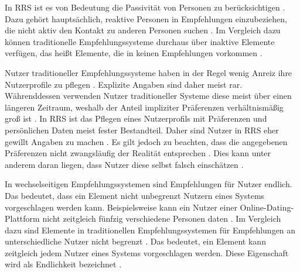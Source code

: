 In RRS ist es von Bedeutung die Passivität von Personen zu berücksichtigen \cite[S. 35]{li:inproceedings}.
Dazu gehört hauptsächlich, reaktive Personen in Empfehlungen einzubeziehen, die nicht aktiv den Kontakt zu anderen Personen suchen \cite[S. 459]{pizzato:2013}.
Im Vergleich dazu können traditionelle Empfehlungssysteme durchaus über inaktive Elemente verfügen, das heißt Elemente, die in keinen Empfehlungen vorkommen \cite[S. 208]{pizzato:2010}.

Nutzer traditioneller Empfehlungssysteme haben in der Regel wenig Anreiz ihre Nutzerprofile zu pflegen \cite[S. 546]{koprinska:inbook}.
Explizite Angaben sind daher meist rar.
Währenddessen verwenden Nutzer traditioneller Systeme diese meist über einen längeren Zeitraum, weshalb der Anteil impliziter Präferenzen verhältnismäßig groß ist \cite[S. 208]{pizzato:2010}.
In RRS ist das Pflegen eines Nutzerprofils mit Präferenzen und persönlichen Daten meist fester Bestandteil.
Daher sind Nutzer in RRS eher gewillt Angaben zu machen \cite[S. 208]{pizzato:2010}.
Es gilt jedoch zu beachten, dass die angegebenen Präferenzen nicht zwangsläufig der Realität entsprechen \cite[S. 457]{pizzato:2013}.
Dies kann unter anderem daran liegen, dass Nutzer diese selbst falsch einschätzen \cite[S. 457]{pizzato:2013}.

In wechselseitigen Empfehlungssystemen sind Empfehlungen für Nutzer endlich.
Das bedeutet, dass ein Element nicht unbegrenzt Nutzern eines Systems vorgeschlagen werden kann.
Beispielsweise kann ein Nutzer einer Online-Dating-Plattform nicht zeitgleich fünfzig verschiedene Personen daten \cite[S. 35]{li:inproceedings}.
Im Vergleich dazu sind Elemente in traditionellen Empfehlungssystemen für Empfehlungen an unterschiedliche Nutzer nicht begrenzt \cite[S. 1468]{yildirim:article}.
Das bedeutet, ein Element kann zeitgleich jedem Nutzer eines Systems vorgeschlagen werden.
Diese Eigenschaft wird als Endlichkeit bezeichnet \cite[S. 35]{li:inproceedings}.

